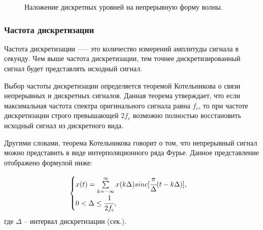 	\begin{figure}[!h]
		\caption{Наложение дискретных уровней на непрерывную форму волны.}
		\label{fig:dfunc}
	\end{figure}

	\subsubsection*{Частота дискретизации}
	
		\par Частота дискретизации —-- это количество измерений амплитуды сигнала в секунду. Чем выше частота дискретизации, тем точнее дискретизированный сигнал будет представлять исходный сигнал. 

		\par Выбор частоты дискретизации определяется теоремой Котельникова о связи непрерывных и дискретных сигналов. 
		Данная теорема утверждает, что если максимальная частота спектра оригинального сигнала равна $f_{c}$,
		то при частоте дискретизации строго превышающей $2f_{c}$ возможно полностью восстановить исходный сигнал из дискретного вида.
		
		\par Другими словами, теорема Котельникова говорит о том, что непрерывный сигнал можно представить в виде интерполяционного ряда Фурье.
		Данное представление отображено формулой ниже:

		\begin{displaymath}
			\begin{cases}
				x(t) = \sum\limits^{\infty}_{k = -\infty}x(k\Delta)sinc[\cfrac{\pi}{\Delta}(t - k\Delta)], \\
				0 < \Delta \leq \cfrac{1}{2f_{c}},
			\end{cases}
		\end{displaymath}
		где $\Delta$ -- интервал дискретизации (сек.).
	
